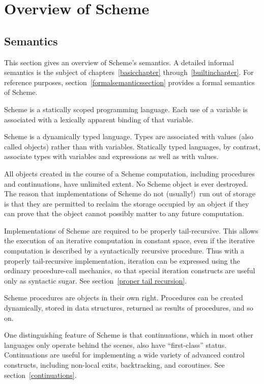 
\chapter{Overview of Scheme}

\section{Semantics}
\label{semanticsection}

This section gives an overview of Scheme's semantics.  A
detailed informal semantics is the subject of
chapters~\ref{basicchapter} through~\ref{builtinchapter}.  For reference
purposes, section~\ref{formalsemanticssection} provides a formal
semantics of Scheme.

\vest Scheme is a statically scoped programming
language.  Each use of a variable is associated with a lexically
apparent binding of that variable.

\vest Scheme is a dynamically typed language.  Types
are associated with values (also called objects) rather than
with variables.  
Statically typed languages, by contrast, associate types with
variables and expressions as well as with values.

\vest All objects created in the course of a Scheme computation, including
procedures and continuations, have unlimited extent.
No Scheme object is ever destroyed.  The reason that
implementations of Scheme do not (usually!)\ run out of storage is that
they are permitted to reclaim the storage occupied by an object if
they can prove that the object cannot possibly matter to any future
computation.  

\vest Implementations of Scheme are required to be properly tail-recursive.
This allows the execution of an iterative computation in constant space,
even if the iterative computation is described by a syntactically
recursive procedure.  Thus with a properly tail-recursive implementation,
iteration can be expressed using the ordinary procedure-call
mechanics, so that special iteration constructs are useful only as
syntactic sugar.  See section~\ref{proper tail recursion}.

\vest Scheme procedures are objects in their own right.  Procedures can be
created dynamically, stored in data structures, returned as results of
procedures, and so on.  

\vest One distinguishing feature of Scheme is that continuations, which
in most other languages only operate behind the scenes, also have
``first-class'' status.  Continuations are useful for implementing a
wide variety of advanced control constructs, including non-local exits,
backtracking, and coroutines.  See section~\ref{continuations}.

